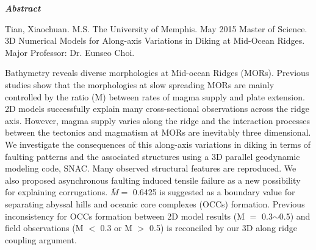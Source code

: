 \begin{center}
\textbf{\textit{\large{Abstract}}}
\end{center}

\vspace{0.5cm}

\begin{singlespace*}
Tian, Xiaochuan. M.S. The University of Memphis. May 2015 Master of Science. 3D Numerical Models for Along-axis Variations in Diking at Mid-Ocean Ridges. Major Professor: Dr. Eunseo Choi.
\end{singlespace*}

\vspace{0.5cm}

Bathymetry reveals diverse morphologies at Mid-ocean Ridges (MORs). Previous studies show that the morphologies at slow spreading MORs are mainly controlled by the ratio (M) between rates of magma supply and plate extension. 2D models successfully explain many cross-sectional observations across the ridge axis. However, magma supply varies along the ridge and the interaction processes between the tectonics and magmatism at MORs are inevitably three dimensional. We investigate the consequences of this along-axis variations in diking in terms of faulting patterns and the associated structures using a 3D parallel geodynamic modeling code, SNAC. Many observed structural features are reproduced. We also proposed asynchronous faulting induced tensile failure as a new possibility for explaining corrugations. $\bar{M} =$ 0.6425 is suggested as a boundary value for separating abyssal hills and oceanic core complexes (OCCs) formation. Previous inconsistency for OCCs formation between 2D model results (M $=$ 0.3$\sim$0.5) and field observations (M $<$ 0.3 or M $>$ 0.5) is reconciled by our 3D along ridge coupling argument.  

